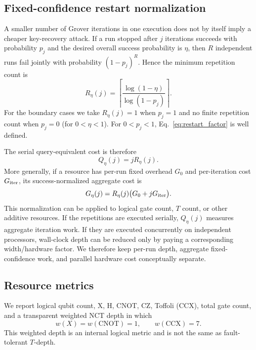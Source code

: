 \documentclass[10pt,a4paper]{article}
\begin{document}
\subsection{Fixed-confidence restart normalization}
\label{subsec:fixed_confidence}
A smaller number of Grover iterations in one execution does not by itself imply a cheaper key-recovery attack.  If a run stopped after $j$ iterations succeeds with probability $p_j$ and the desired overall success probability is $\eta$, then $R$ independent runs fail jointly with probability $(1-p_j)^R$.  Hence the minimum repetition count is
\begin{equation}
    R_{\eta}(j)=
    \left\lceil
    \frac{\log(1-\eta)}{\log(1-p_j)}
    \right\rceil .
    \label{eq:restart_factor}
\end{equation}
For the boundary cases we take $R_{\eta}(j)=1$ when $p_j=1$ and no finite repetition count when $p_j=0$ (for $0<\eta<1$). For $0<p_j<1$, Eq.~\eqref{eq:restart_factor} is well defined.

The serial query-equivalent cost is therefore
\begin{equation}
    Q_{\eta}(j)=jR_{\eta}(j).
    \label{eq:fixed_success_cost}
\end{equation}
More generally, if a resource has per-run fixed overhead $G_0$ and per-iteration cost $G_{\rm iter}$, its success-normalized aggregate cost is
\begin{equation}
    G_{\eta}(j)=R_{\eta}(j)\bigl(G_0+jG_{\rm iter}\bigr).
    \label{eq:fixed_success_resource}
\end{equation}
This normalization can be applied to logical gate count, $T$ count, or other additive resources.  If the repetitions are executed serially, $Q_{\eta}(j)$ measures aggregate iteration work.  If they are executed concurrently on independent processors, wall-clock depth can be reduced only by paying a corresponding width/hardware factor.  We therefore keep per-run depth, aggregate fixed-confidence work, and parallel hardware cost conceptually separate.

\subsection{Resource metrics}
We report logical qubit count, X, H, CNOT, CZ, Toffoli (CCX), total gate count, and a transparent weighted NCT depth in which
\begin{equation}
    w(X)=w(\mathrm{CNOT})=1,\qquad w(\mathrm{CCX})=7.
\end{equation}
This weighted depth is an internal logical metric and is not the same as fault-tolerant $T$-depth.
\end{document}
